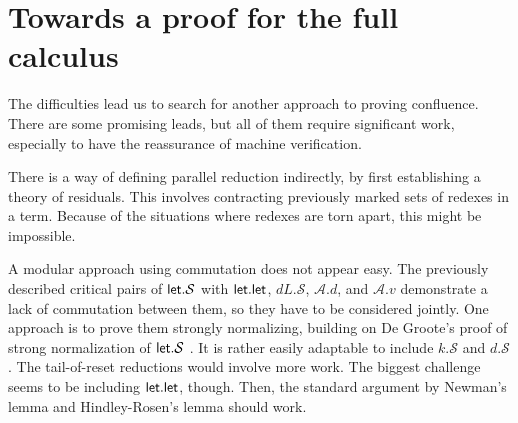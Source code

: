\documentclass[a4paper, 11pt,titlepage, openright, twoside]{report}
\newcommand{\keyword}[1]{\textsf{\textup{#1}}}
\newcommand{\KwLet}{\keyword{let}}
\renewcommand{\S}{\mathcal{S}}
\newcommand{\A}{\mathcal{A}}
\newcommand{\+}{\enspace}
\begin{document}
\section{Towards a proof for the full calculus}
The difficulties lead us to search for another approach to proving confluence.
There are some promising leads, but all of them require significant work,
especially to have the reassurance of machine verification.

There is a way of defining
parallel reduction indirectly, by first establishing a theory of residuals.
This involves contracting previously marked sets of redexes in a term.
Because of the situations where redexes are torn apart, this might be impossible.

A modular approach using commutation does not appear easy.
The previously described critical pairs of $\KwLet{}.\S$ with $\KwLet{}.\KwLet{}$, $dL.\S$, $\A.d$, and $\A.v$
demonstrate a lack of commutation between them, so they have to be considered jointly.
One approach is to prove them strongly normalizing,
building on De Groote's proof of strong normalization of $\KwLet{}.\S$ \cite{Groote}.
It is rather easily adaptable to include $k.\S$ and $d.\S$.
The tail-of-reset reductions would involve more work.
The biggest challenge seems to be including $\KwLet{}.\KwLet{}$, though.
Then, the standard argument by Newman's lemma and Hindley-Rosen's lemma should work.
\end{document}
